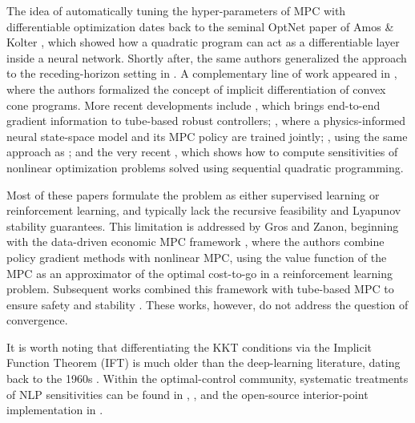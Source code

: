 \documentclass[journal,twoside,web,final]{ieeecolor}
\theoremstyle{definition}
\begin{document}
The idea of automatically tuning the hyper-parameters of MPC with differentiable optimization dates back to the seminal OptNet paper of Amos \& Kolter \cite{amos2017optnet}, which showed how a quadratic program can act as a differentiable layer inside a neural network. Shortly after, the same authors generalized the approach to the receding-horizon setting in \cite{amos2018differentiable}. A complementary line of work appeared in \cite{agrawal2020learning}, where the authors formalized the concept of implicit differentiation of convex cone programs. More recent developments include \cite{oshin2023differentiable}, which brings end-to-end gradient information to tube-based robust controllers; \cite{drgovna2022differentiable}, where a physics-informed neural state-space model and its MPC policy are trained jointly; \cite{tao2024difftune}, using the same approach as \cite{amos2018differentiable}; and the very recent \cite{frey2025differentiable}, which shows how to compute sensitivities of nonlinear optimization problems solved using sequential quadratic programming.

Most of these papers formulate the problem as either supervised learning or reinforcement learning, and typically lack the recursive feasibility and Lyapunov stability guarantees. This limitation is addressed by Gros and Zanon, beginning with the data-driven economic MPC framework \cite{gros2019data}, where the authors combine policy gradient methods with nonlinear MPC, using the value function of the MPC as an approximator of the optimal cost-to-go in a reinforcement learning problem. Subsequent works combined this framework with tube-based MPC to ensure safety \cite{gros2020safe,gros2022learning} and stability \cite{zanon2019practical}. These works, however, do not address the question of convergence.

It is worth noting that differentiating the KKT conditions via the Implicit Function Theorem (IFT) is much older than the deep-learning literature, dating back to the 1960s \cite{Fiacco1990nonlinear,jittorntrum1978sequential}. Within the optimal-control community, systematic treatments of NLP sensitivities can be found in \cite{pirnay2012optimal}, \cite{andersson2018sensitivity}, and the open-source interior-point implementation in \cite{frey2025differentiable}.
\end{document}
